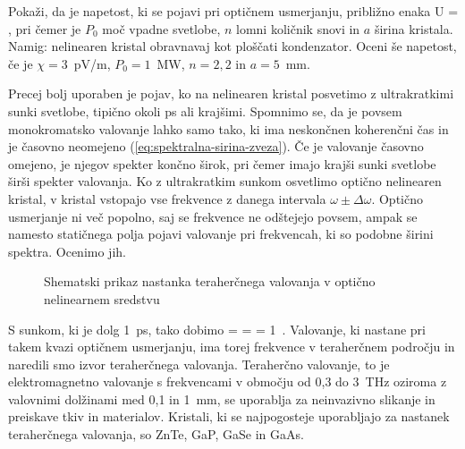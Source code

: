 \begin{definition}
Pokaži, da je napetost, ki se pojavi pri optičnem usmerjanju, približno enaka
\beq
U = ,
\eeq
pri čemer je $P_0$ moč vpadne svetlobe, $n$ lomni količnik snovi in $a$ širina kristala.
Namig: nelinearen kristal obravnavaj kot ploščati kondenzator. Oceni še napetost, če je
$\chi = 3$~pV/m, $P_0 = 1$~MW, $n = 2,2$ in $a = 5$~mm. 
\end{definition}

Precej bolj uporaben je pojav, ko na nelinearen kristal posvetimo z ultrakratkimi 
sunki svetlobe, tipično okoli ps ali krajšimi. Spomnimo se, da je povsem monokromatsko valovanje
lahko samo tako, ki ima neskončnen koherenčni čas in je časovno neomejeno 
(\ref{eq:spektralna-sirina-zveza}). 
Če je valovanje časovno omejeno, je njegov spekter končno širok, pri čemer imajo krajši 
sunki svetlobe širši spekter valovanja. Ko z ultrakratkim sunkom osvetlimo optično 
nelinearen kristal, v kristal vstopajo vse frekvence z danega intervala $\omega \pm \Delta \omega$.
Optično usmerjanje ni več popolno, saj se frekvence ne odštejejo povsem, ampak se 
namesto statičnega polja pojavi valovanje pri frekvencah, ki so podobne širini spektra. Ocenimo jih. 

\begin{figure}[h]
\centering
\def\svgwidth{90truemm} 

\caption{Shematski prikaz nastanka teraherčnega valovanja v optično nelinearnem sredstvu}
\label{fig:THz}
\end{figure}

S sunkom, ki je dolg 1~ps, tako dobimo
\beq
\Delta \omega =  =  = 1~.
\eeq
Valovanje, ki nastane pri takem kvazi optičnem usmerjanju, ima torej frekvence v teraherčnem
področju in naredili smo izvor teraherčnega valovanja. Teraherčno valovanje, to je 
elektromagnetno valovanje s frekvencami v območju od 0,3 do 3~THz oziroma z valovnimi dolžinami 
med 0,1 in 1~mm, se uporablja za neinvazivno slikanje in preiskave tkiv in materialov. Kristali, ki 
se najpogosteje uporabljajo za nastanek teraherčnega valovanja, so ZnTe, GaP, GaSe in GaAs.

